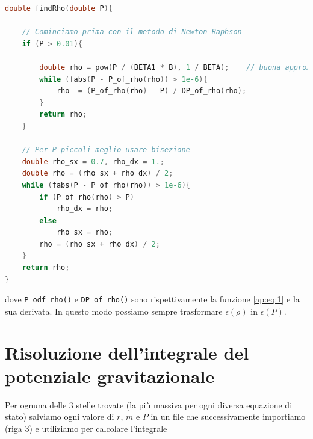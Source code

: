 \documentclass[a4paper, titlepage]{article}
\begin{document}
\begin{lstlisting}[language=C]
double findRho(double P){

    // Cominciamo prima con il metodo di Newton-Raphson
    if (P > 0.01){

        double rho = pow(P / (BETA1 * B), 1 / BETA);    // buona approx. iniziale
        while (fabs(P - P_of_rho(rho)) > 1e-6){
            rho -= (P_of_rho(rho) - P) / DP_of_rho(rho);
        }
        return rho;
    }

    // Per P piccoli meglio usare bisezione
    double rho_sx = 0.7, rho_dx = 1.;
    double rho = (rho_sx + rho_dx) / 2;
    while (fabs(P - P_of_rho(rho)) > 1e-6){
        if (P_of_rho(rho) > P)
            rho_dx = rho;
        else
            rho_sx = rho;
        rho = (rho_sx + rho_dx) / 2;
    }
    return rho;
}
\end{lstlisting}

dove \texttt{P\_odf\_rho()} e \texttt{DP\_of\_rho()} sono rispettivamente la funzione \ref{ap:eq:1} e la sua derivata. In questo modo possiamo sempre trasformare $\epsilon (\rho)$ in $\epsilon (P)$.



\section{Risoluzione dell'integrale del potenziale gravitazionale} \label{ap:Phi}

Per ognuna delle 3 stelle trovate (la più massiva per ogni diversa equazione di stato) salviamo ogni valore di $r$, $m$ e $P$ in un file che successivamente importiamo (riga 3) e utiliziamo per calcolare l'integrale
\end{document}
